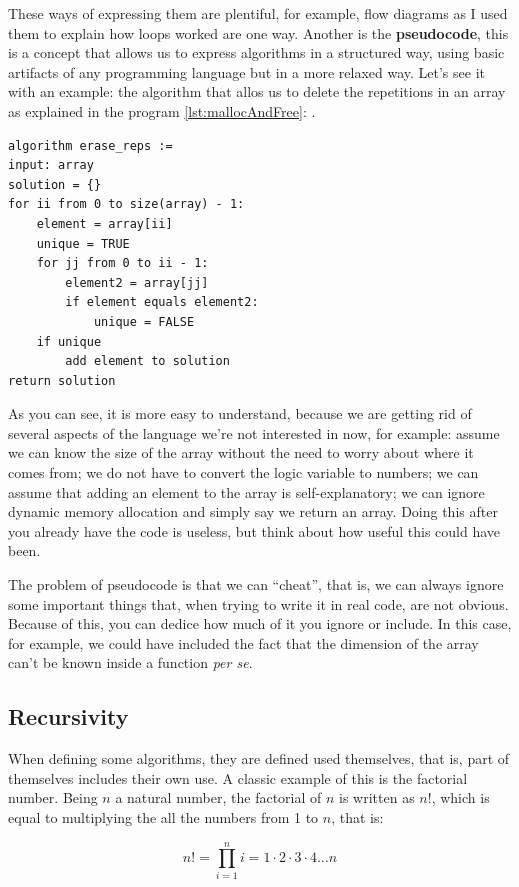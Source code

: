 \documentclass[a4paper]{article}
\begin{document}
These ways of expressing them are plentiful, for example, flow diagrams
as I used them to explain how loops worked are one way. Another is the
\textbf{pseudocode}, this is a concept that allows us to express algorithms
in a structured way, using basic artifacts of any programming language but in a
more relaxed way. Let's see it with an example: the algorithm that allos us to
delete the repetitions in an array as explained in the program
\ref{lst:mallocAndFree}: .

\begin{lstlisting}[style=pseudoCode]
algorithm erase_reps :=
input: array
solution = {}
for ii from 0 to size(array) - 1:
    element = array[ii]
    unique = TRUE
    for jj from 0 to ii - 1:
        element2 = array[jj]
        if element equals element2:
            unique = FALSE
    if unique
        add element to solution
return solution
\end{lstlisting}

As you can see, it is more easy to understand, because we are getting rid of
several aspects of the language we're not interested in now, for example:
assume we can know the size of the array without the need to worry about where
it comes from; we do not have to convert the logic variable to numbers; we
can assume that adding an element to the array is self-explanatory; we can
ignore dynamic memory allocation and simply say we return an array. Doing this
after you already have the code is useless, but think about how useful this
could have been.

The problem of pseudocode is that we can ``cheat'', that is, we can always
ignore some important things that, when trying to write it in real code,
are not obvious. Because of this, you can dedice how much of it you ignore or
include. In this case, for example, we could have included the fact that the
dimension of the array can't be known inside a function \textit{per se}.

\subsection{Recursivity}
When defining some algorithms, they are defined used themselves, that is, part
of themselves includes their own use. A classic example of this is the factorial
number. Being $n$ a natural number, the factorial of $n$ is written as $n!$,
which is equal to multiplying the all the numbers from 1 to $n$, that is:

$$
n! = \prod^{n}_{i=1}{i}= 1\!\cdot\!2\!\cdot\!3\!\cdot\!4\dots{}n
$$
\end{document}
